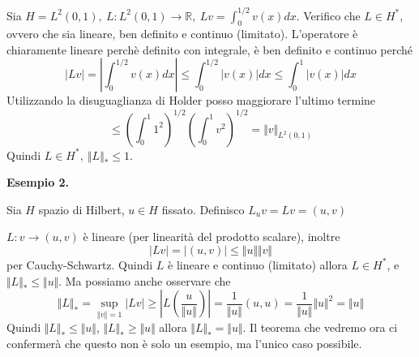 \documentclass[10pt,a4paper,twoside,openright]{book}
\begin{document}
Sia $\displaystyle H=L^{2}(0,1),\ L:L^{2}(0,1)\rightarrow \mathbb{R},\ Lv=\int ^{1/2}_{0} v(x) dx$. Verifico che $\displaystyle L\in H^{*}$, ovvero che sia lineare, ben definito e continuo (limitato). L'operatore è chiaramente lineare perchè definito con integrale, è ben definito e continuo perché
\begin{equation*}
| Lv| =\left| \int ^{1/2}_{0} v(x) dx\right| \leqslant \int ^{1/2}_{0}| v(x)| dx\leqslant \int ^{1}_{0}| v(x)| dx
\end{equation*}
Utilizzando la disuguaglianza di Holder posso maggiorare l'ultimo termine
\begin{equation*}
\leqslant \left(\int ^{1}_{0} 1^{2}\right)^{1/2}\left(\int ^{1}_{0} v^{2}\right)^{1/2} =\Vert v\Vert _{L^{2}(0,1)}
\end{equation*}
Quindi $\displaystyle L\in H^{*},\ \Vert L\Vert _{*} \leqslant 1$.



\textbf{Esempio 2.}

Sia $\displaystyle H$ spazio di Hilbert, $\displaystyle u\in H$ fissato. Definisco $\displaystyle L_{u} v=Lv=(u,v)$

$\displaystyle L:v\rightarrow (u,v)$ è lineare (per linearità del prodotto scalare), inoltre
\begin{equation*}
| Lv| =| (u,v)| \leqslant \Vert u\Vert \Vert v\Vert 
\end{equation*}
per Cauchy-Schwartz. Quindi $\displaystyle L$ è lineare e continuo (limitato) allora $\displaystyle L\in H^{*}$, e $\displaystyle \Vert L\Vert _{*} \leqslant \Vert u\Vert $. Ma possiamo anche osservare che 
\begin{equation*}
\Vert L\Vert _{*} =\sup _{\Vert v\Vert =1}| Lv| \geqslant \left| L\left(\frac{u}{\Vert u\Vert }\right)\right| =\frac{1}{\Vert u\Vert }(u,u) =\frac{1}{\Vert u\Vert }\Vert u\Vert ^{2} =\Vert u\Vert 
\end{equation*}
Quindi $\displaystyle \Vert L\Vert _{*} \leqslant \Vert u\Vert $, $\displaystyle \Vert L\Vert _{*} \geqslant \Vert u\Vert $ allora $\displaystyle \Vert L\Vert _{*} =\Vert u\Vert $. Il teorema che vedremo ora ci confermerà che questo non è solo un esempio, ma l'unico caso possibile.
\end{document}
